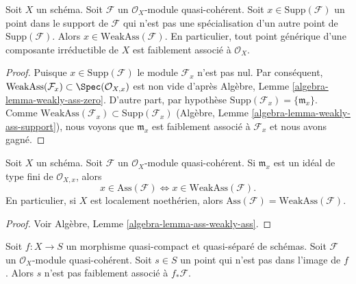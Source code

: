 \begin{lemma}
\label{lemma-minimal-support-in-weakly-ass}
Soit  $X$  un schéma. Soit  $\mathcal{F}$  un  $\mathcal{O}_X$-module
quasi-cohérent. Soit  $x \in \text{Supp}(\mathcal{F})$  un point dans le support de  $\mathcal{F}$  qui
n'est pas une spécialisation d'un autre point de  $\text{Supp}(\mathcal{F})$. Alors  $x \in \text{WeakAss}(\mathcal{F})$.
En particulier, tout point générique d'une composante irréductible de  $X$ 
est faiblement associé à  $\mathcal{O}_X$.
\end{lemma}

\begin{proof}
Puisque  $x \in \text{Supp}(\mathcal{F})$  le module  $\mathcal{F}_x$  n'est pas nul. Par conséquent,
 $\text{WeakAss}(\mathcal{F}_x) \subset \Spec(\mathcal{O}_{X, x})$  est non vide d'après Algèbre, Lemme  \ref{algebra-lemma-weakly-ass-zero}. D'autre part, par
hypothèse  $\text{Supp}(\mathcal{F}_x) = \{\mathfrak m_x\}$. Comme  $\text{WeakAss}(\mathcal{F}_x) \subset \text{Supp}(\mathcal{F}_x)$  (Algèbre, Lemme  \ref{algebra-lemma-weakly-ass-support}), nous
voyons que  $\mathfrak m_x$  est faiblement associé à  $\mathcal{F}_x$  et nous avons gagné.
\end{proof}

\begin{lemma}
\label{lemma-ass-weakly-ass}
Soit  $X$  un schéma. Soit  $\mathcal{F}$  un  $\mathcal{O}_X$-module
quasi-cohérent. Si  $\mathfrak m_x$  est un idéal de type fini de  $\mathcal{O}_{X, x}$, alors
$$
x \in \text{Ass}(\mathcal{F}) \Leftrightarrow
x \in \text{WeakAss}(\mathcal{F}).
$$
En particulier, si  $X$  est localement noethérien, alors  $\text{Ass}(\mathcal{F}) = \text{WeakAss}(\mathcal{F})$.
\end{lemma}

\begin{proof}
Voir Algèbre, Lemme  \ref{algebra-lemma-ass-weakly-ass}.
\end{proof}

\begin{lemma}
\label{lemma-weakass-pushforward}
Soit  $f : X \to S$  un morphisme quasi-compact et quasi-séparé de schémas. Soit
 $\mathcal{F}$  un  $\mathcal{O}_X$-module quasi-cohérent. Soit  $s \in S$  un point qui
n'est pas dans l'image de  $f$. Alors  $s$  n'est pas faiblement
associé à  $f_*\mathcal{F}$.
\end{lemma}

